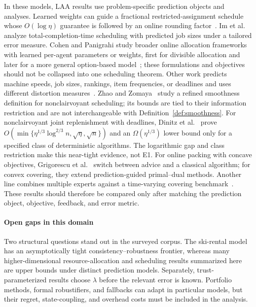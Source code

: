 \documentclass[acmsmall,screen,nonacm]{acmart}
\theoremstyle{acmdefinition}%
\begin{document}
In these models, LAA results use problem-specific prediction objects and analyses. Learned weights can guide a fractional restricted-assignment schedule whose $O(\log\eta)$ guarantee is followed by an online rounding factor~\cite{lattanzi2020online}. Im et al.~\cite{im2021nonclairvoyant} analyze total-completion-time scheduling with predicted job sizes under a tailored error measure. Cohen and Panigrahi study broader online allocation frameworks with learned per-agent parameters or weights, first for divisible allocation and later for a more general option-based model~\cite{cohen2023allocation,cohen2025allocation}; these formulations and objectives should not be collapsed into one scheduling theorem. Other work predicts machine speeds, job sizes, rankings, item frequencies, or deadlines and uses different distortion measures~\cite{lindermayr2023speed,balkanski2023speed,balkanski2023energy,azar2021flowtime,azar2022distortion,im2021knapsack,ahmadian2023loadbalancing,dinitz2026jrp}. Zhao and Zomaya~\cite{zhao2026smoothness} study a refined smoothness definition for nonclairvoyant scheduling; its bounds are tied to their information restriction and are not interchangeable with Definition~\ref{def:smoothness}. For nonclairvoyant joint replenishment with deadlines, Dinitz et al.~\cite{dinitz2026jrp} prove $O(\min\{\eta^{1/3}\log^{2/3}n,\sqrt{\eta},\sqrt n\})$ and an $\Omega(\eta^{1/3})$ lower bound only for a specified class of deterministic algorithms. The logarithmic gap and class restriction make this near-tight evidence, not E1. For online packing with concave objectives, Grigorescu et al.~\cite{grigorescu2025packing} switch between advice and a classical algorithm; for convex covering, they extend prediction-guided primal--dual methods. Another line combines multiple experts against a time-varying covering benchmark~\cite{nguyen2026covering}. These results should therefore be compared only after matching the prediction object, objective, feedback, and error metric.

\paragraph*{Open gaps in this domain}
Two structural questions stand out in the surveyed corpus. The ski-rental model has an asymptotically tight consistency--robustness frontier, whereas many higher-dimensional resource-allocation and scheduling results summarized here are upper bounds under distinct prediction models. Separately, trust-parameterized results choose $\lambda$ before the relevant error is known. Portfolio methods, formal robustifiers, and fallbacks can adapt in particular models, but their regret, state-coupling, and overhead costs must be included in the analysis.
\end{document}

